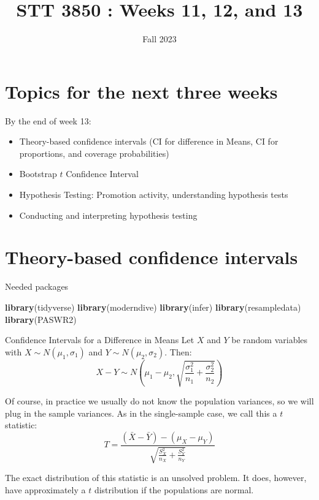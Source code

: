 \documentclass[
  ignorenonframetext,
]{beamer}
\title{STT 3850 : Weeks 11, 12, and 13}
\author{Fall 2023}
\date{}
\institute{Appalachian State University}
\newenvironment{Shaded}{\begin{snugshade}}{\end{snugshade}}
\newcommand{\FunctionTok}[1]{\textcolor[rgb]{0.13,0.29,0.53}{\textbf{#1}}}
\newcommand{\NormalTok}[1]{#1}
\providecommand{\tightlist}{%
  \setlength{\itemsep}{0pt}\setlength{\parskip}{0pt}}
\begin{document}
\frame{\titlepage}

\hypertarget{topics-for-the-next-three-weeks}{%
\section{Topics for the next three
weeks}\label{topics-for-the-next-three-weeks}}

\begin{frame}{By the end of week 13:}
\protect\hypertarget{by-the-end-of-week-13}{}
\begin{itemize}
\tightlist
\item
  Theory-based confidence intervals (CI for difference in Means, CI for
  proportions, and coverage probabilities)
\item
  Bootstrap \(t\) Confidence Interval
\item
  Hypothesis Testing: Promotion activity, understanding hypothesis tests
\item
  Conducting and interpreting hypothesis testing
\end{itemize}
\end{frame}

\hypertarget{theory-based-confidence-intervals}{%
\section{Theory-based confidence
intervals}\label{theory-based-confidence-intervals}}

\begin{frame}[fragile]{Needed packages}
\protect\hypertarget{needed-packages}{}
\begin{Shaded}
\begin{Highlighting}[]
\FunctionTok{library}\NormalTok{(tidyverse)}
\FunctionTok{library}\NormalTok{(moderndive)}
\FunctionTok{library}\NormalTok{(infer)}
\FunctionTok{library}\NormalTok{(resampledata)}
\FunctionTok{library}\NormalTok{(PASWR2)}
\end{Highlighting}
\end{Shaded}
\end{frame}

\begin{frame}{Confidence Intervals for a Difference in Means}
\protect\hypertarget{confidence-intervals-for-a-difference-in-means}{}
Let \(X\) and \(Y\) be random variables with
\(X\sim N(\mu_1, \sigma_1)\) and \(Y\sim N(\mu_2, \sigma_2)\). Then:
\[X-Y\sim N\left(\mu_1-\mu_2, \sqrt{\frac{\sigma_1^2}{n_1}+\frac{\sigma_2^2}{n_2}}\right)\]

Of course, in practice we usually do not know the population variances,
so we will plug in the sample variances. As in the single-sample case,
we call this a \(t\) statistic:
\[T=\frac{(\bar{X}-\bar{Y})-(\mu_X-\mu_Y)}{\sqrt{\frac{S^2_X}{n_X}+\frac{S^2_Y}{n_Y}}}\]

The exact distribution of this statistic is an unsolved problem. It
does, however, have approximately a \(t\) distribution if the
populations are normal.
\end{frame}
\end{document}
